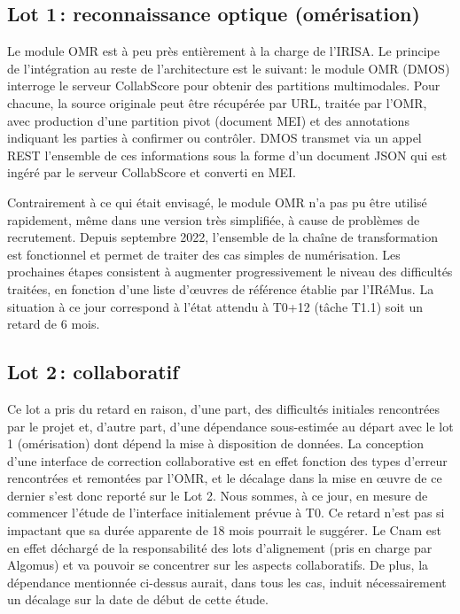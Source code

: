 \documentclass[11pt]{article}
\begin{document}
\subsection{Lot 1\,: reconnaissance optique (omérisation)}

Le module OMR est à peu près entièrement à la charge de l'IRISA. Le principe de l'intégration au reste de 
l'architecture est le suivant: le module OMR (DMOS) interroge le serveur CollabScore pour obtenir des partitions multimodales.
Pour chacune, la source originale peut être récupérée par URL, traitée par l'OMR, avec production d'une partition
pivot (document MEI) et des annotations indiquant les parties à confirmer ou contrôler. 
DMOS transmet via un appel REST l'ensemble de ces informations sous la forme d'un document JSON 
qui est ingéré par le serveur CollabScore et converti en MEI.

Contrairement à ce qui était envisagé, le module OMR n'a pas pu être utilisé
rapidement, même dans une version très simplifiée,  à cause de problèmes de recrutement. 
Depuis septembre 2022, 
l'ensemble de la chaîne de transformation est  fonctionnel et permet de traiter
des cas simples de numérisation. Les prochaines étapes consistent à augmenter progressivement le
niveau des difficultés traitées, en fonction d'une liste d'œuvres de référence établie par l'IRéMus.
La situation à ce jour correspond à l'état attendu à T0+12 (tâche T1.1) 
soit un retard de 6 mois.

\subsection{Lot 2\,: collaboratif}

Ce lot a pris du retard en raison, d'une part, des difficultés initiales rencontrées par le projet 
et, d'autre part, d'une dépendance 
sous-estimée au départ avec le lot 1 (omérisation) dont dépend la mise à disposition de données.
La conception d'une interface de correction collaborative est
en effet fonction des types d'erreur rencontrées et remontées par l'OMR, et le décalage dans la
mise en œuvre de ce dernier s'est donc reporté sur le Lot 2. Nous 
sommes, à ce jour, en mesure de commencer l'étude de l'interface initialement prévue à T0.
Ce retard n'est pas si impactant que sa durée apparente de 18 mois pourrait le suggérer. 
Le Cnam est en effet déchargé de la responsabilité des lots d'alignement (pris en charge par Algomus)
et va pouvoir se concentrer sur les aspects collaboratifs. De plus, la dépendance mentionnée ci-dessus
aurait, dans tous les cas, induit nécessairement un décalage sur la date de début de cette étude.
\end{document}
